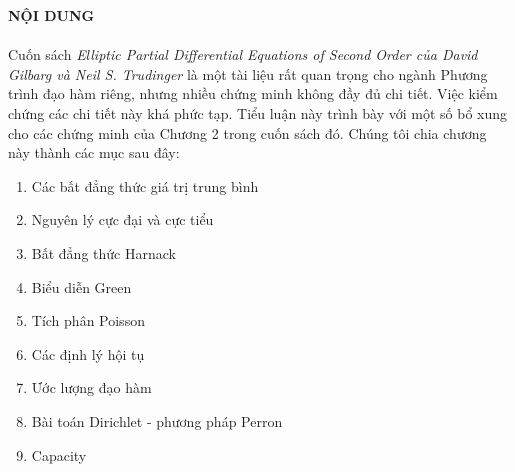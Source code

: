 \textbf{\Large NỘI DUNG}
\\
\\

Cuốn sách \textit{Elliptic Partial Differential Equations of Second Order của David Gilbarg và Neil S. Trudinger} là một tài liệu rất  quan trọng cho ngành Phương trình đạo hàm riêng, nhưng nhiều chứng minh không đầy đủ chi tiết. Việc kiểm chứng các chi tiết này khá phức tạp. Tiểu luận này trình bày  với một số bổ xung cho các chứng 
minh của  Chương 2 trong cuốn sách đó. Chúng tôi chia chương này thành các  mục sau đây:
\begin{enumerate}
\item Các bất đẳng thức giá trị trung bình
\item Nguyên lý cực đại và cực tiểu
\item Bất đẳng thức Harnack
\item Biểu diễn Green
\item Tích phân Poisson
\item Các định lý hội tụ
\item Ước lượng đạo hàm
\item Bài toán Dirichlet - phương pháp Perron
\item Capacity
\end{enumerate}
